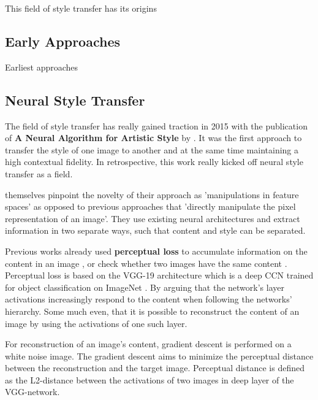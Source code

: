 This field of style transfer has its origins 

\subsection{Early Approaches}
Earliest approaches

\subsection{Neural Style Transfer}
The field of style transfer has really gained traction in 2015 with the publication of \textbf{A Neural Algorithm for Artistic Style} by \citeauthor*{gatys}.
It was the first approach to transfer the style of one image to another and at the same time maintaining a high contextual fidelity.
In retrospective, this work really kicked off neural style transfer as a field.

\citeauthor*{gatys} themselves pinpoint the novelty of their approach as 'manipulations in feature spaces' as opposed to previous approaches that 'directly manipulate the pixel representation of an image'\cite{gatys}.
They use existing neural architectures and extract information in two separate ways, such that content and style can be separated.

Previous works already used \textbf{perceptual loss} to accumulate information on the content in an image \cite{percep_loss}, or check whether two images have the same content \cite{other_percep_loss}.
Perceptual loss is based on the VGG-19 architecture \cite{VGG} which is a deep CCN trained for object classification on ImageNet \cite{imagenet}.
By arguing that the network's layer activations increasingly respond to the content when following the networks' hierarchy.
Some much even, that it is possible to reconstruct the content of an image by using the activations of one such layer.

For reconstruction of an image's content, gradient descent is performed on a white noise image.
The gradient descent aims to minimize the perceptual distance between the reconstruction and the target image.
Perceptual distance is defined as the L2-distance between the activations of two images in deep layer of the VGG-network.

